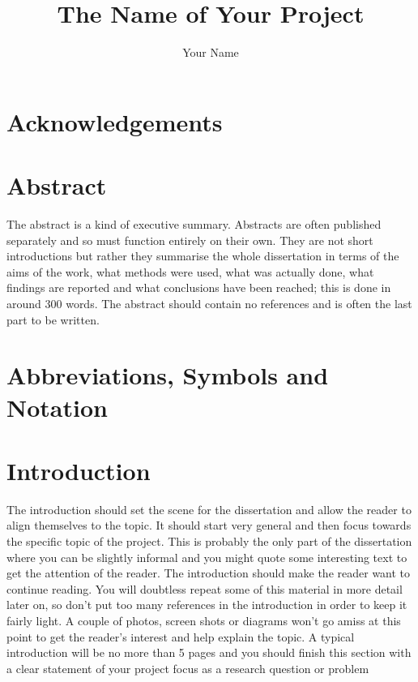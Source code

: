 \documentclass[a4paper, 12pt]{article}
\title{The Name of Your Project}
\author{Your Name}
\institute{Name of Your University}
\begin{document}
	
\addfrontmatter


\section{Acknowledgements} %


\pagebreak


\section{Abstract} %
The abstract is a kind of executive summary. Abstracts are often published separately and so must function entirely on their own. They are not short introductions but rather they summarise the whole dissertation in terms of the aims of the work, what methods were used, what was actually done, what findings are reported and what conclusions have been reached; this is done in around 300 words. The abstract should contain no references and is often the last part to be written.

\pagebreak


\section{Abbreviations, Symbols and Notation} %


\pagebreak


\section{Introduction}
The introduction should set the scene for the dissertation and allow the reader to align themselves to the topic. It should start very general and then focus towards the specific topic of the project. This is probably the only part of the dissertation where you can be slightly informal and you might quote some interesting text to get the attention of the reader. The introduction should make the reader want to continue reading. You will doubtless repeat some of this material in more detail later on, so don’t put too many references in the introduction in order to keep it fairly light. A couple of photos, screen shots or diagrams won’t go amiss at this point to get the reader’s interest and help explain the topic. A typical introduction will be no more than 5 pages and you should finish this section with a clear statement of your project focus as a research question or problem
\end{document}
